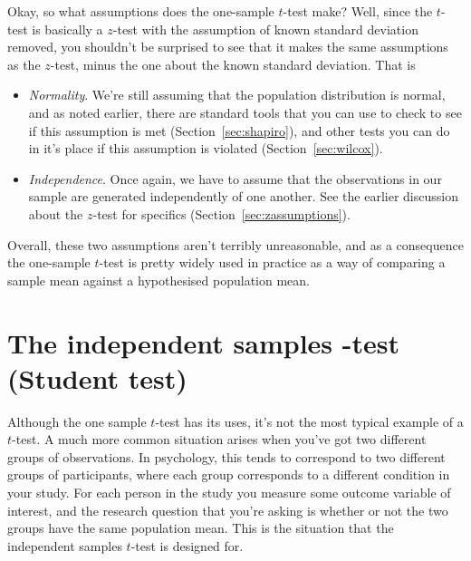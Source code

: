 Okay, so what assumptions does the one-sample $t$-test make? Well, since the $t$-test is basically a $z$-test with the assumption of known standard deviation removed, you shouldn't be surprised to see that it makes the same assumptions as the $z$-test, minus the one about the known standard deviation. That is
\begin{itemize}
\item {\it Normality}. We're still assuming that the population distribution is normal, and as noted earlier, there are standard tools that you can use to check to see if this assumption is met (Section~\ref{sec:shapiro}), and other tests you can do in it's place if this assumption is violated (Section~\ref{sec:wilcox}).
\item {\it Independence}. Once again, we have to assume that the observations in our sample are generated independently of one another. See the earlier discussion about the $z$-test for specifics (Section~\ref{sec:zassumptions}).
\end{itemize}
Overall, these two assumptions aren't terribly unreasonable, and as a consequence the one-sample $t$-test is pretty widely used in practice as a way of comparing a sample mean against a hypothesised population mean.


\section{The independent samples \texorpdfstring{}{}-test (Student test)~\label{sec:studentttest}}

Although the one sample $t$-test has its uses, it's not the most typical example of a $t$-test. A much more common situation arises when you've got two different groups of observations. In psychology, this tends to correspond to two different groups of participants, where each group corresponds to a different condition in your study. For each person in the study you measure some outcome variable of interest, and the research question that you're asking is whether or not the two groups have the same population mean. This is the situation that the independent samples $t$-test is designed for. 

